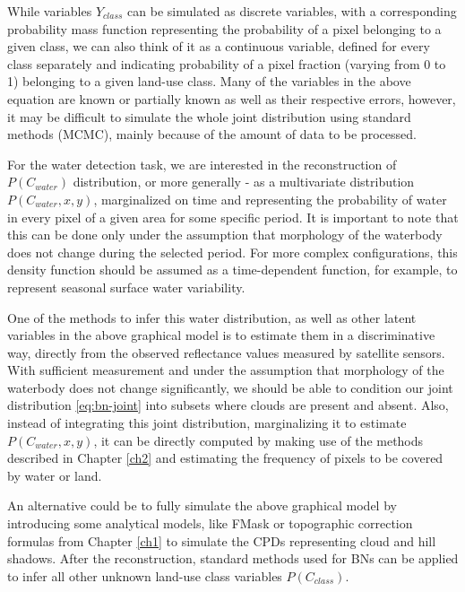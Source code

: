 While variables $Y_{class}$ can be simulated as discrete variables, with a corresponding probability mass function representing the probability of a pixel belonging to a given class, we can also think of it as a continuous variable, defined for every class separately and indicating probability of a pixel fraction (varying from 0 to 1) belonging to a given land-use class. Many of the variables in the above equation are known or partially known as well as their respective errors, however, it may be difficult to simulate the whole joint distribution using standard methods (MCMC), mainly because of the amount of data to be processed.

For the water detection task, we are interested in the reconstruction of $P(C_{water})$ distribution, or more generally - as a multivariate distribution $P(C_{water}, x, y)$, marginalized on time and representing the probability of water in every pixel of a given area for some specific period. It is important to note that this can be done only under the assumption that morphology of the waterbody does not change during the selected period. For more complex configurations, this density function should be assumed as a time-dependent function, for example, to represent seasonal surface water variability. 

One of the methods to infer this water distribution, as well as other latent variables in the above graphical model is to estimate them in a discriminative way, directly from the observed reflectance values measured by satellite sensors. With sufficient measurement and under the assumption that morphology of the waterbody does not change significantly, we should be able to condition our joint distribution \ref{eq:bn-joint} into subsets where clouds are present and absent. Also, instead of integrating this joint distribution, marginalizing it to estimate $P(C_{water}, x, y)$, it can be directly computed by making use of the methods described in Chapter \ref{ch2} and estimating the frequency of pixels to be covered by water or land.

An alternative could be to fully simulate the above graphical model by introducing some analytical models, like FMask or topographic correction formulas from Chapter \ref{ch1} to simulate the CPDs representing cloud and hill shadows. After the reconstruction, standard methods used for BNs can be applied to infer all other unknown land-use class variables $P(C_{class})$.


